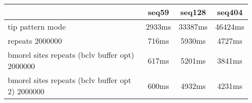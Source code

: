 \begin{tabular}{|l|c|c|c|}
\hline
 & seq59 & seq128 & seq404  \\
\hline
tip pattern mode &  2933ms &  33387ms &  46424ms\\
\hline
repeats 2000000 &  716ms &  5930ms &  4727ms\\
\hline
bmorel sites repeats (bclv buffer opt) 2000000 &  617ms &  5201ms &  3841ms\\
\hline
bmorel sites repeats (bclv buffer opt 2) 2000000 &  600ms &  4932ms &  4231ms\\
\hline
\end{tabular}
